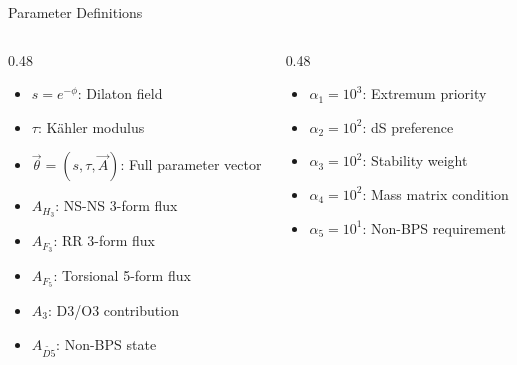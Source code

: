 \begin{frame}{Parameter Definitions}
\blurbackground
\begin{columns}
\begin{column}{0.48\textwidth}
\begin{tcolorbox}[
    enhanced,
    colback=black!85,
    colframe=mypurple,
    arc=3mm,
    boxrule=1pt,
    title={\color{Yellow!80!white}Moduli Fields}
]
\begin{itemize}
    \item $s = e^{-\phi}$: Dilaton field
    \item $\tau$: Kähler modulus
    \item $\vec{\theta} = (s, \tau, \vec{A})$: Full parameter vector
\end{itemize}
\end{tcolorbox}

\vspace{0.3cm}

\begin{tcolorbox}[
    enhanced,
    colback=black!85,
    colframe=mypurple,
    arc=3mm,
    boxrule=1pt,
    title={\color{Yellow!80!white}Flux Coefficients}
]
\begin{itemize}
    \item $A_{H_3}$: NS-NS 3-form flux
    \item $A_{F_3}$: RR 3-form flux  
    \item $A_{F_5}$: Torsional 5-form flux
    \item $A_3$: D3/O3 contribution
    \item $A_{\widetilde{D5}}$: Non-BPS state
\end{itemize}
\end{tcolorbox}
\end{column}

\begin{column}{0.48\textwidth}
\begin{tcolorbox}[
    enhanced,
    colback=black!85,
    colframe=AntiqueWhite,
    arc=3mm,
    boxrule=1pt,
    title={\color{mypurple}Optimization Weights}
]
\begin{itemize}
    \item $\alpha_1 = 10^3$: Extremum priority
    \item $\alpha_2 = 10^2$: dS preference
    \item $\alpha_3 = 10^2$: Stability weight
    \item $\alpha_4 = 10^2$: Mass matrix condition
    \item $\alpha_5 = 10^1$: Non-BPS requirement
\end{itemize}
\end{tcolorbox}


\end{column}
\end{columns}
\end{frame}
